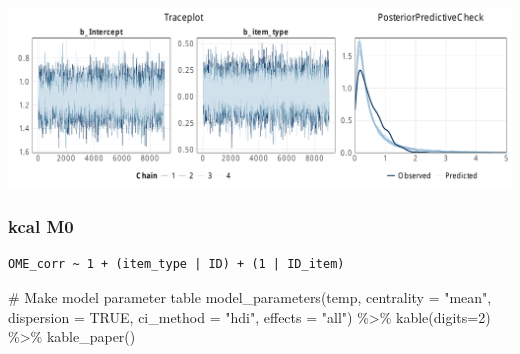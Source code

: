 \documentclass[
  letterpaper,
  DIV=11,
  numbers=noendperiod]{scrartcl}
\newenvironment{Shaded}{\begin{snugshade}}{\end{snugshade}}
\newcommand{\AttributeTok}[1]{\textcolor[rgb]{0.40,0.45,0.13}{#1}}
\newcommand{\CommentTok}[1]{\textcolor[rgb]{0.37,0.37,0.37}{#1}}
\newcommand{\ConstantTok}[1]{\textcolor[rgb]{0.56,0.35,0.01}{#1}}
\newcommand{\DecValTok}[1]{\textcolor[rgb]{0.68,0.00,0.00}{#1}}
\newcommand{\FunctionTok}[1]{\textcolor[rgb]{0.28,0.35,0.67}{#1}}
\newcommand{\NormalTok}[1]{\textcolor[rgb]{0.00,0.23,0.31}{#1}}
\newcommand{\OtherTok}[1]{\textcolor[rgb]{0.00,0.23,0.31}{#1}}
\newcommand{\SpecialCharTok}[1]{\textcolor[rgb]{0.37,0.37,0.37}{#1}}
\newcommand{\StringTok}[1]{\textcolor[rgb]{0.13,0.47,0.30}{#1}}
\begin{document}
\includegraphics{supplement_files/figure-pdf/h2aM1CO2-1.pdf}

\subsubsection{kcal M0}\label{kcal-m0-2}

\begin{Shaded}
\end{Shaded}

\begin{verbatim}
OME_corr ~ 1 + (item_type | ID) + (1 | ID_item) 
\end{verbatim}

\begin{Shaded}
\begin{Highlighting}[]
\CommentTok{\# Make model parameter table}
\FunctionTok{model\_parameters}\NormalTok{(temp, }\AttributeTok{centrality =} \StringTok{"mean"}\NormalTok{, }\AttributeTok{dispersion =} \ConstantTok{TRUE}\NormalTok{, }
                 \AttributeTok{ci\_method =} \StringTok{"hdi"}\NormalTok{, }\AttributeTok{effects =} \StringTok{"all"}\NormalTok{) }\SpecialCharTok{\%\textgreater{}\%} 
  \FunctionTok{kable}\NormalTok{(}\AttributeTok{digits=}\DecValTok{2}\NormalTok{) }\SpecialCharTok{\%\textgreater{}\%} \FunctionTok{kable\_paper}\NormalTok{()}
\end{Highlighting}
\end{Shaded}
\end{document}
